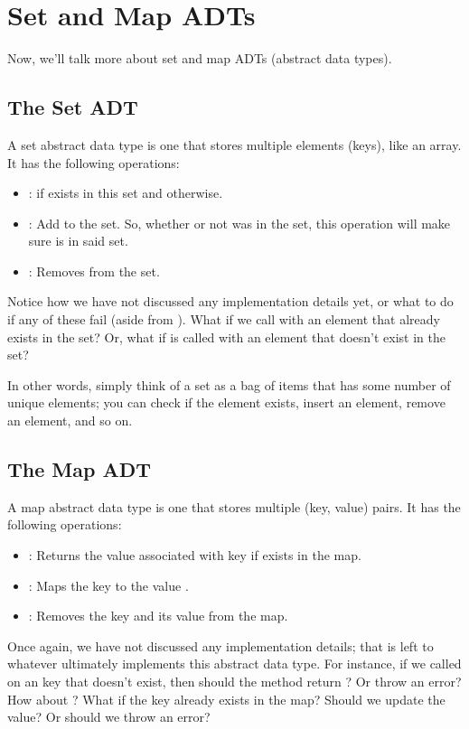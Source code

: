 \documentclass[letterpaper]{article}
\begin{document}
\newpage 
\section{Set and Map ADTs}
Now, we'll talk more about set and map ADTs (abstract data types).

\subsection{The Set ADT}
A set abstract data type is one that stores multiple elements (keys), like an array. It has the following operations: 
\begin{itemize}
    \item {}:  if  exists in this set and  otherwise.
    \item {}: Add  to the set. So, whether or not  was in the set, this operation will make sure  is in said set. 
    \item {}: Removes  from the set.  
\end{itemize}
Notice how we have not discussed any implementation details yet, or what to do if any of these fail (aside from ). What if we call  with an element that already exists in the set? Or, what if  is called with an element that doesn't exist in the set? 

\bigskip 

In other words, simply think of a set as a bag of items that has some number of unique elements; you can check if the element exists, insert an element, remove an element, and so on. 

\subsection{The Map ADT}
A map abstract data type is one that stores multiple (key, value) pairs. It has the following operations: 
\begin{itemize}
    \item {}: Returns the value associated with key  if  exists in the map.
    \item {}: Maps the key  to the value .
    \item {}: Removes the key  and its value from the map. 
\end{itemize}
Once again, we have not discussed any implementation details; that is left to whatever ultimately implements this abstract data type. For instance, if we called  on an key  that doesn't exist, then should the method return ? Or throw an error? How about ? What if the key  already exists in the map? Should we update the value? Or should we throw an error? 
\end{document}
